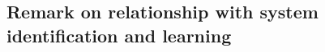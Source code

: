 \documentclass{article}
\newcommand{\train}{\mathcal{D}}
\newcommand{\KL}{\mathrm{KL}}
\renewcommand{\KL}{\mathrm{KL}}
\newtheorem{remark}[theorem]{Remark}
\newcommand{\bE}{\mathbf{E}}
\begin{document}
\subsection{Remark on relationship with system identification and learning}
\label{app:indent}
\end{document}
